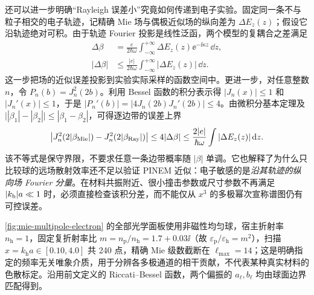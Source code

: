 还可以进一步明确“Rayleigh 误差小”究竟如何传递到电子实验。固定同一条不与粒子相交的电子轨迹，记精确 Mie 场与偶极近似场的纵向差为 $\Delta E_z(z)$；假设它沿轨迹绝对可积。由于轨迹 Fourier 投影是线性泛函，两个模型的复耦合之差满足
\begin{align}
\Delta\beta&=\frac{e}{2\hbar\omega}
 \int_{-\infty}^{+\infty}\Delta E_z(z)\ee^{-\ii\kappa z}\,\dd z,\\
|\Delta\beta|&\le\frac{|e|}{2\hbar\omega}
 \int_{-\infty}^{+\infty}|\Delta E_z(z)|\,\dd z.
\label{eq:mie-rayleigh-trajectory-error}
\end{align}
这一步把场的近似误差投影到实验实际采样的函数空间中。更进一步，对任意整数 $n$，令 $P_n(b)=J_n^2(2b)$。利用 Bessel 函数的积分表示得 $|J_n(x)|\le1$ 和 $|J_n'(x)|\le1$，于是 $|P_n'(b)|=|4J_n(2b)J_n'(2b)|\le4$。由微积分基本定理及 $\big||\beta_1|-|\beta_2|\big|\le|\beta_1-\beta_2|$，可得逐边带的误差上界
\begin{equation}
 \big|J_n^2(2|\beta_{\rm Mie}|)
 -J_n^2(2|\beta_{\rm Ray}|)\big|
 \le4|\Delta\beta|
 \le\frac{2|e|}{\hbar\omega}
 \int|\Delta E_z(z)|\,\mathrm{d} z.
 \label{eq:mie-rayleigh-sideband-error}
\end{equation}
该不等式是保守界限，不要求任意一条边带概率随 $|\beta|$ 单调。它也解释了为什么只比较球的远场散射效率还不足以验证 PINEM 近似：电子敏感的是\emph{沿其轨迹的纵向场 Fourier 分量}。在材料共振附近、很小撞击参数或尺寸参数不再满足 $|k_{\rm h}|a\ll1$ 时，必须直接检查该积分差，而不能仅从 $x^3$ 的多极幂次宣称谱图仍有可控误差。

\par\medskip
\cref{fig:mie-multipole-electron} 的全部光学面板使用非磁性均匀球，宿主折射率 $n_{\mathrm h}=1$，固定复折射率比 $m=n_{\mathrm p}/n_{\mathrm h}=1.7+0.03\ii$（故 $\varepsilon_{\mathrm p}/\varepsilon_{\mathrm h}=m^2$），扫描 $x=k_{\mathrm h}a\in[0.10,4.0]$ 共 240 点，精确 Mie 级数截断在 $\ell_{\max}=14$；这是明确指定的频率无关唯象介质，用于分辨各多极通道的相干贡献，不代表某种真实材料的色散标定。沿用前文定义的 Riccati--Bessel 函数，两个偏振的 $a_\ell,b_\ell$ 均由球面边界匹配得到。

